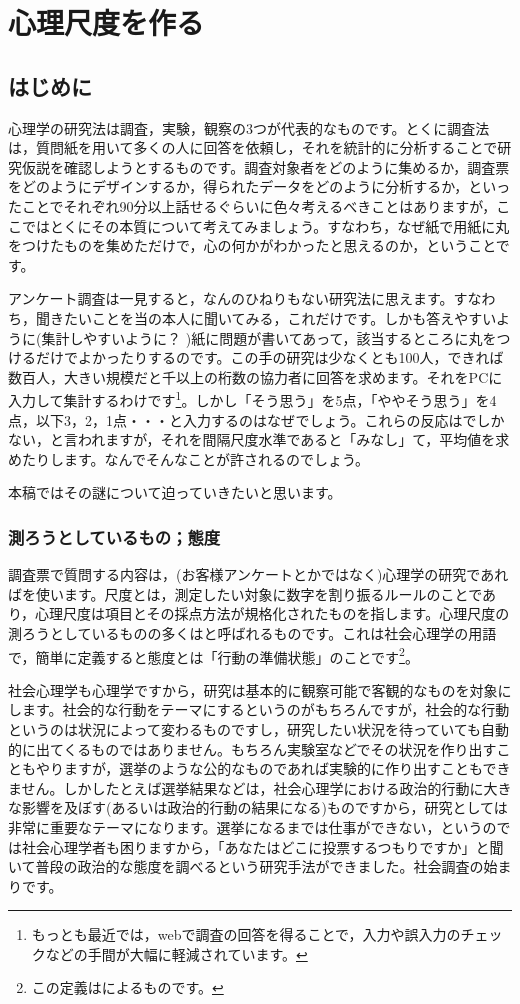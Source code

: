 \documentclass{ltjsbook}
\begin{document}
\chapter{心理尺度を作る}
\label{x02_testTheory}
\section{はじめに}
心理学の研究法は調査，実験，観察の3つが代表的なものです。とくに調査法は，質問紙を用いて多くの人に回答を依頼し，それを統計的に分析することで研究仮説を確認しようとするものです。調査対象者をどのように集めるか，調査票をどのようにデザインするか，得られたデータをどのように分析するか，といったことでそれぞれ90分以上話せるぐらいに色々考えるべきことはありますが，ここではとくにその本質について考えてみましょう。すなわち，なぜ紙で用紙に丸をつけたものを集めただけで，心の何かがわかったと思えるのか，ということです。

アンケート調査は一見すると，なんのひねりもない研究法に思えます。すなわち，聞きたいことを当の本人に聞いてみる，これだけです。しかも答えやすいように(集計しやすいように？ )紙に問題が書いてあって，該当するところに丸をつけるだけでよかったりするのです。この手の研究は少なくとも100人，できれば数百人，大きい規模だと千以上の桁数の協力者に回答を求めます。それをPCに入力して集計するわけです\footnote{もっとも最近では，webで調査の回答を得ることで，入力や誤入力のチェックなどの手間が大幅に軽減されています。}。しかし「そう思う」を5点，「ややそう思う」を4点，以下3，2，1点・・・と入力するのはなぜでしょう。これらの反応はでしかない，と言われますが，それを間隔尺度水準であると「みなし」て，平均値を求めたりします。なんでそんなことが許されるのでしょう。

本稿ではその謎について迫っていきたいと思います。
\subsection{測ろうとしているもの；態度}
調査票で質問する内容は，(お客様アンケートとかではなく)心理学の研究であればを使います。尺度とは，測定したい対象に数字を割り振るルールのことであり，心理尺度は項目とその採点方法が規格化されたものを指します。心理尺度の測ろうとしているものの多くはと呼ばれるものです。これは社会心理学の用語で，簡単に定義すると態度とは「行動の準備状態」のことです\footnote{この定義は\citet{Allport1935}によるものです。}。

社会心理学も心理学ですから，研究は基本的に観察可能で客観的なものを対象にします。社会的な行動をテーマにするというのがもちろんですが，社会的な行動というのは状況によって変わるものですし，研究したい状況を待っていても自動的に出てくるものではありません。もちろん実験室などでその状況を作り出すこともやりますが，選挙のような公的なものであれば実験的に作り出すこともできません。しかしたとえば選挙結果などは，社会心理学における政治的行動に大きな影響を及ぼす(あるいは政治的行動の結果になる)ものですから，研究としては非常に重要なテーマになります。選挙になるまでは仕事ができない，というのでは社会心理学者も困りますから，「あなたはどこに投票するつもりですか」と聞いて普段の政治的な態度を調べるという研究手法ができました。社会調査の始まりです。
\end{document}
